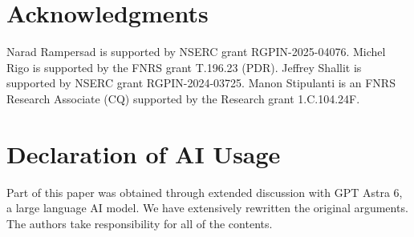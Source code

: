 \documentclass[12pt]{article}
\theoremstyle{plain}
\theoremstyle{definition}
\theoremstyle{remark}
\numberwithin{equation}{section}
\begin{document}
\section*{Acknowledgments}
Narad Rampersad is supported by NSERC grant RGPIN-2025-04076.
Michel Rigo is supported by the FNRS grant T.196.23 (PDR). 
Jeffrey Shallit is supported by NSERC grant RGPIN-2024-03725.
Manon Stipulanti is an FNRS Research Associate (CQ) supported by the Research grant 1.C.104.24F. 



\section*{Declaration of AI Usage}

Part of this paper was obtained through extended discussion with GPT Astra 6, a large language AI model.
We have extensively rewritten the original arguments.  The authors take responsibility for all of the contents.




\end{document}
